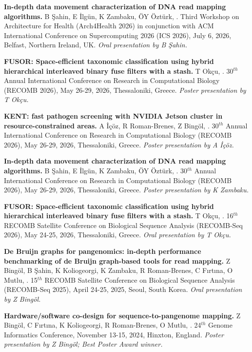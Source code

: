 \textbf{In-depth data movement characterization of DNA read mapping algorithms.} B Şahin, E İlgün, K Zambaku, ÖY Öztürk, \calkan{}. Third Workshop on Architecture for Health (Arch4Health 2026) in conjunction with ACM International Conference on Supercomputing 2026 (ICS 2026), July 6, 2026, Belfast, Northern Ireland, UK. \textit{Oral presentation by B Şahin.}


\textbf{FUSOR: Space-efficient taxonomic classification using hybrid hierarchical interleaved binary fuse filters with a stash.} T Okçu, \calkan{}. 30$^{th}$ Annual International Conference on Research in Computational Biology (RECOMB 2026), May 26-29, 2026, Thessaloniki, Greece. \textit{Poster presentation by T Okçu.}

\clearpage

\textbf{KENT: fast pathogen screening with NVIDIA Jetson cluster in resource-constrained areas.} A İçöz, R Roman-Brenes, Z Bingöl, \calkan{}. 30$^{th}$ Annual International Conference on Research in Computational Biology (RECOMB 2026), May 26-29, 2026, Thessaloniki, Greece. \textit{Poster presentation by A İçöz.}


\textbf{In-depth data movement characterization of DNA read mapping algorithms.} B Şahin, E İlgün, K Zambaku, ÖY Öztürk, \calkan{}. 30$^{th}$ Annual International Conference on Research in Computational Biology (RECOMB 2026), May 26-29, 2026, Thessaloniki, Greece. \textit{Poster presentation by K Zambaku.}


\textbf{FUSOR: Space-efficient taxonomic classification using hybrid hierarchical interleaved binary fuse filters with a stash.} T Okçu, \calkan{}. 16$^{th}$ RECOMB Satellite Conference on Biological Sequence Analysis (RECOMB-Seq 2026), May 24-25, 2026, Thessaloniki, Greece. \textit{Oral presentation by T Okçu.}

\vspace{-.2cm}
{\bf De Bruijn graphs for pangenomics: in-depth performance benchmarking of de Bruijn graph-based tools for read mapping.} Z Bingöl, B Şahin, K Koliogeorgi, K Zambaku, R Roman-Brenes,  C Fırtına, O Mutlu, \calkan{}. 15$^{th}$ RECOMB Satellite Conference on Biological Sequence Analysis (RECOMB-Seq 2025), April 24-25, 2025, Seoul, South Korea. \textit{Oral presentation by Z Bingöl.}


\vspace{-.2cm}
{\bf Hardware/software co-design for sequence-to-pangenome mapping.} Z Bingöl, C Fırtına, K Koliogeorgi, R Roman-Brenes, O Mutlu, \calkan{}. 24$^{th}$ Genome Informatics Conference, November 13-15, 2024, Hinxton, England. \textit{Poster presentation by Z Bingöl; Best Poster Award winner.}


